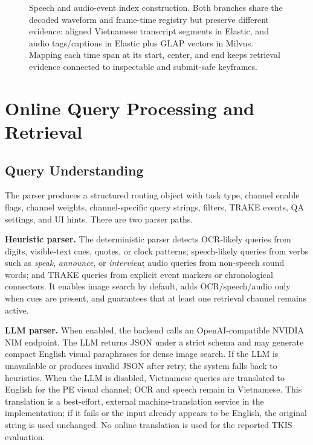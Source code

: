 \documentclass[conference]{IEEEtran}
\begin{document}
\begin{figure}[t]
{
}
\caption{Speech and audio-event index construction. Both branches share the
decoded waveform and frame-time registry but preserve different evidence:
aligned Vietnamese transcript segments in Elastic, and audio tags/captions in
Elastic plus GLAP vectors in Milvus. Mapping each time span at its start, center,
and end keeps retrieval evidence connected to inspectable and submit-safe
keyframes.}
\label{fig:speech-audio-indexing}
\end{figure}

\section{Online Query Processing and Retrieval}

\subsection{Query Understanding}

The parser produces a structured routing object with task type, channel enable
flags, channel weights, channel-specific query strings, filters, TRAKE events,
QA settings, and UI hints. There are two parser paths.

\textbf{Heuristic parser.} The deterministic parser detects OCR-likely queries
from digits, visible-text cues, quotes, or clock patterns; speech-likely queries
from verbs such as \emph{speak}, \emph{announce}, or \emph{interview}; audio
queries from non-speech sound words; and TRAKE queries from explicit event
markers or chronological connectors. It enables image search by default, adds
OCR/speech/audio only when cues are present, and guarantees that at least one
retrieval channel remains active.

\textbf{LLM parser.} When enabled, the backend calls an OpenAI-compatible NVIDIA
NIM endpoint. The LLM returns JSON under a strict schema and may generate compact
English visual paraphrases for dense image search. If the LLM is unavailable or
produces invalid JSON after retry, the system falls back to heuristics. When the
LLM is disabled, Vietnamese queries are translated to English for the PE visual
channel; OCR and speech remain in Vietnamese. This translation is a best-effort,
external machine-translation service in the implementation; if it fails or the
input already appears to be English, the original string is used unchanged. No
online translation is used for the reported TKIS evaluation.
\end{document}
